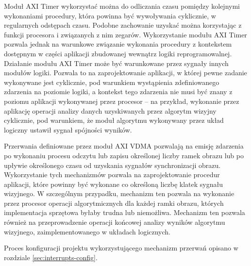 Moduł AXI Timer wykorzystać można do odliczania czasu pomiędzy kolejnymi wykonaniami procedury, która powinna być wywoływania cyklicznie, w regularnych odstępach czasu. 
Podobne zachowanie uzyskać można korzystając z funkcji procesora i związanych z nim zegarów. 
Wykorzystanie modułu AXI Timer pozwala jednak na warunkowe związanie wykonania procedury z kontekstem dostępnym w części aplikacji zbudowanej wewnątrz logiki reprogramowalnej. %
Działanie modułu AXI Timer może być warunkowane przez sygnały innych modułów logiki. 
Pozwala to na zaprojektowanie aplikacji, w której pewne zadanie wykonywane jest cyklicznie, pod warunkiem wystąpienia zdefiniowanego zdarzenia na poziomie logiki, a kontekst tego zdarzenia nie musi być znany z poziomu aplikacji wykonywanej przez procesor -- na przykład, wykonanie przez aplikację operacji analizy danych uzyskiwanych przez algorytm wizyjny cyklicznie, pod warunkiem, że moduł algorytmu wykonywany przez układ logiczny ustawił sygnał spójności wyników.

Przerwania definiowane przez moduł AXI VDMA pozwalają na emisję zdarzenia po wykonaniu procesu odczytu lub zapisu określonej liczby ramek obrazu lub po upływie określonego czasu od uzyskania sygnałów synchronizacji obrazu. %
Wykorzystanie tych mechanizmów pozwala na zaprojektowanie procedur aplikacji, które powinny być wykonane co określoną liczbę klatek sygnału wizyjnego. 
W szczególnym przypadku, mechanizm ten pozwala na wykonanie przez procesor operacji algorytmicznych dla każdej ramki obrazu, których implementacja sprzętowa byłaby trudna lub niemożliwa. 
Mechanizm ten pozwala również na przeprowadzenie operacji końcowej analizy wyników algorytmu wizyjnego, zaimplementowanego w układach logicznych. %

Proces konfiguracji projektu wykorzystującego mechanizm przerwań opisano w rozdziale \ref{sec:interrupts-config}.